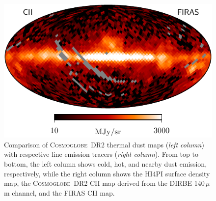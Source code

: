 \documentclass{aa}
\def\Cosmoglobe{\textsc{Cosmoglobe}}
\begin{document}
\begin{figure}
  \includegraphics[width=0.49\linewidth]{figures/init_CII_firas_n16_v20.pdf}
  \caption{Comparison of \Cosmoglobe\ DR2 thermal dust maps (\emph{left column}) with respective line emission tracers (\emph{right column}). From top to bottom, the left column shows cold, hot, and nearby dust emission, respectively, while the right column shows the HI4PI surface density map, the \Cosmoglobe\ DR2 CII map derived from the DIRBE 140\,$\mu$m channel, and the FIRAS CII map.  }
  \label{fig:dustmaps}
\end{figure}
\end{document}
